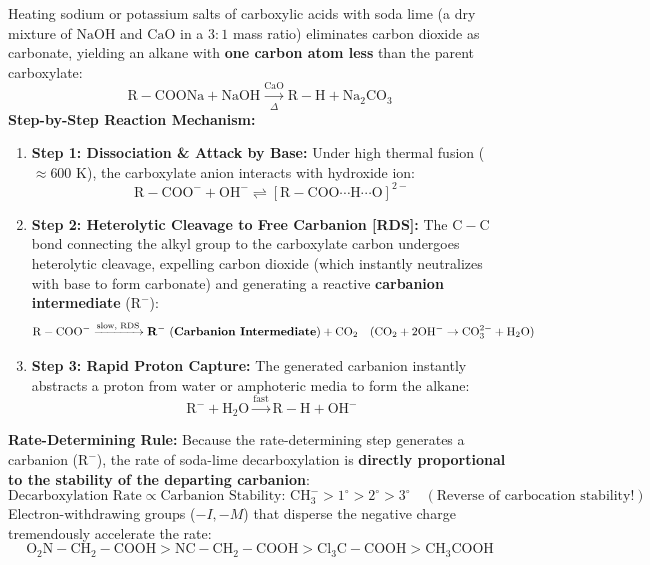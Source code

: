 \documentclass[10pt,a4paper]{article}
\begin{document}
\begin{conceptbox}
Heating sodium or potassium salts of carboxylic acids with soda lime (a dry mixture of $\mathrm{NaOH}$ and $\mathrm{CaO}$ in a $3:1$ mass ratio) eliminates carbon dioxide as carbonate, yielding an alkane with \textbf{one carbon atom less} than the parent carboxylate:
\begin{equation}
  \mathrm{R-COONa} + \mathrm{NaOH} \xrightarrow[\Delta]{\mathrm{CaO}} \mathrm{R-H} + \mathrm{Na_2CO_3}
\end{equation}
\textbf{Step-by-Step Reaction Mechanism:}
\begin{enumerate}[leftmargin=*]
  \item \textbf{Step 1: Dissociation \& Attack by Base:}
  Under high thermal fusion ($\approx 600\text{ K}$), the carboxylate anion interacts with hydroxide ion:
  \begin{equation}
    \mathrm{R-COO^-} + \mathrm{OH^-} \rightleftharpoons [\mathrm{R-COO\cdots H\cdots O}]^{2-}
  \end{equation}
  \item \textbf{Step 2: Heterolytic Cleavage to Free Carbanion [RDS]:}
  The $\mathrm{C-C}$ bond connecting the alkyl group to the carboxylate carbon undergoes heterolytic cleavage, expelling carbon dioxide (which instantly neutralizes with base to form carbonate) and generating a reactive \textbf{carbanion intermediate} ($\mathrm{R^-}$):
  \begin{equation}
    \mathrm{R-COO^-} \xrightarrow{\text{slow, RDS}} \mathbf{R^-} \ (\text{\textbf{Carbanion Intermediate}}) + \mathrm{CO_2} \quad (\mathrm{CO_2} + 2\mathrm{OH^-} \to \mathrm{CO_3^{2-}} + \mathrm{H_2O})
  \end{equation}
  \item \textbf{Step 3: Rapid Proton Capture:}
  The generated carbanion instantly abstracts a proton from water or amphoteric media to form the alkane:
  \begin{equation}
    \mathrm{R^-} + \mathrm{H_2O} \xrightarrow{\text{fast}} \mathrm{R-H} + \mathrm{OH^-}
  \end{equation}
\end{enumerate}
\textbf{Rate-Determining Rule:} Because the rate-determining step generates a carbanion ($\mathrm{R^-}$), the rate of soda-lime decarboxylation is \textbf{directly proportional to the stability of the departing carbanion}:
\begin{equation}
  \text{Decarboxylation Rate} \propto \text{Carbanion Stability: } \mathrm{CH_3^-} > 1^\circ > 2^\circ > 3^\circ \quad (\text{Reverse of carbocation stability!})
\end{equation}
Electron-withdrawing groups ($-I, -M$) that disperse the negative charge tremendously accelerate the rate:
\begin{equation}
  \mathrm{O_2N-CH_2-COOH} > \mathrm{NC-CH_2-COOH} > \mathrm{Cl_3C-COOH} > \mathrm{CH_3COOH}
\end{equation}
\end{conceptbox}
\end{document}
